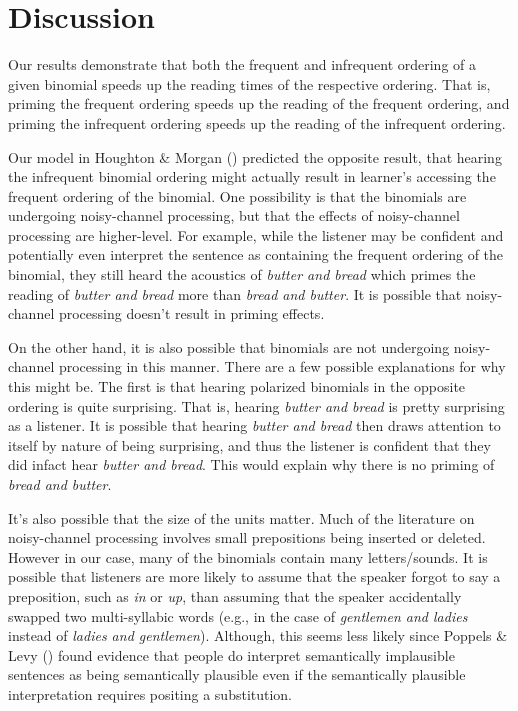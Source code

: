 \documentclass[
  12pt,
]{scrartcl}
\begin{document}
\section{Discussion}\label{discussion}

Our results demonstrate that both the frequent and infrequent ordering
of a given binomial speeds up the reading times of the respective
ordering. That is, priming the frequent ordering speeds up the reading
of the frequent ordering, and priming the infrequent ordering speeds up
the reading of the infrequent ordering.

Our model in Houghton \& Morgan
()
predicted the opposite result, that hearing the infrequent binomial
ordering might actually result in learner's accessing the frequent
ordering of the binomial. One possibility is that the binomials are
undergoing noisy-channel processing, but that the effects of
noisy-channel processing are higher-level. For example, while the
listener may be confident and potentially even interpret the sentence as
containing the frequent ordering of the binomial, they still heard the
acoustics of \emph{butter and bread} which primes the reading of
\emph{butter and bread} more than \emph{bread and butter}. It is
possible that noisy-channel processing doesn't result in priming
effects.

On the other hand, it is also possible that binomials are not undergoing
noisy-channel processing in this manner. There are a few possible
explanations for why this might be. The first is that hearing polarized
binomials in the opposite ordering is quite surprising. That is, hearing
\emph{butter and bread} is pretty surprising as a listener. It is
possible that hearing \emph{butter and bread} then draws attention to
itself by nature of being surprising, and thus the listener is confident
that they did infact hear \emph{butter and bread}. This would explain
why there is no priming of \emph{bread and butter}.

It's also possible that the size of the units matter. Much of the
literature on noisy-channel processing involves small prepositions being
inserted or deleted. However in our case, many of the binomials contain
many letters/sounds. It is possible that listeners are more likely to
assume that the speaker forgot to say a preposition, such as \emph{in}
or \emph{up}, than assuming that the speaker accidentally swapped two
multi-syllabic words (e.g., in the case of \emph{gentlemen and ladies}
instead of \emph{ladies and gentlemen}). Although, this seems less
likely since Poppels \& Levy
() found
evidence that people do interpret semantically implausible sentences as
being semantically plausible even if the semantically plausible
interpretation requires positing a substitution.
\end{document}

